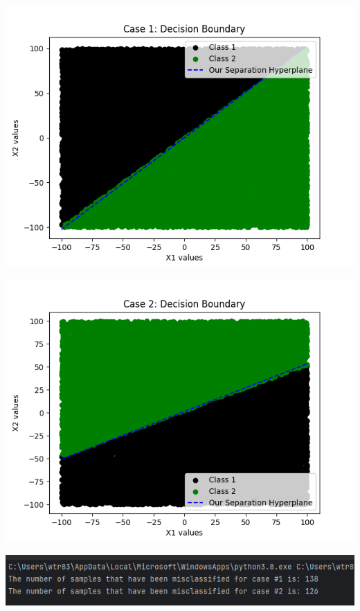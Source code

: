\documentclass{article}
\begin{document}
\begin{center}
\includegraphics[scale=0.75]{../figs/T4.2.png} \\
\end{center}

\begin{center}
\includegraphics[scale=0.75]{../figs/T4.3.png} \\
\end{center}

\begin{center}
\includegraphics[scale=0.75]{../figs/T4.4.png} \\
\end{center}
\end{document}
